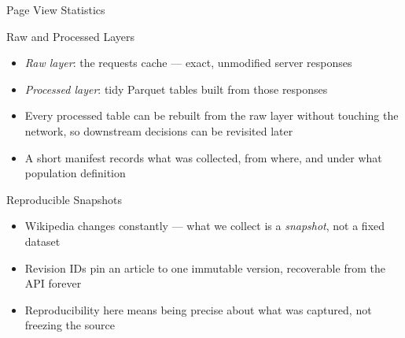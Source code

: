 \documentclass[8pt,aspectratio=169]{beamer}
\begin{document}
\begin{rightframe}{Page View Statistics}
\end{rightframe}

\begin{textframe}{Raw and Processed Layers}

\begin{itemize}
\item \textit{Raw layer}: the requests cache --- exact, unmodified server responses
\item \textit{Processed layer}: tidy Parquet tables built from those responses
\item Every processed table can be rebuilt from the raw layer without touching the network, so downstream decisions can be revisited later
\item A short manifest records what was collected, from where, and under what population definition
\end{itemize}

\end{textframe}

\begin{textframe}{Reproducible Snapshots}

\begin{itemize}
\item Wikipedia changes constantly --- what we collect is a \textit{snapshot}, not a fixed dataset
\item Revision IDs pin an article to one immutable version, recoverable from the API forever
\item Reproducibility here means being precise about what was captured, not freezing the source
\end{itemize}

\end{textframe}
\end{document}
